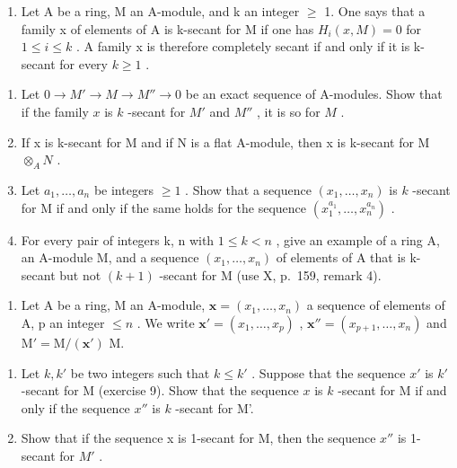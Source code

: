 \begin{enumerate}
\def\labelenumi{\arabic{enumi})}
\setcounter{enumi}{8}
\tightlist
\item
  Let A be a ring, M an A-module, and k an integer \(\geqslant\) 1. One says that a family x of elements of A is k-secant for M if one has \(H_{i}(x, M) = 0\) for \(1 \leqslant i \leqslant k\) . A family x is therefore completely secant if and only if it is k-secant for every \(k \geqslant 1\) .
\end{enumerate}

\begin{enumerate}
\def\labelenumi{\alph{enumi})}
\item
  Let \(0 \to M' \to M \to M'' \to 0\) be an exact sequence of A-modules. Show that if the family \(x\) is \(k\) -secant for \(M'\) and \(M''\) , it is so for \(M\) .
\item
  If x is k-secant for M and if N is a flat A-module, then x is k-secant for M \(\otimes_{A} N\) .
\item
  Let \(a_{1},\ldots,a_{n}\) be integers \(\geqslant 1\) . Show that a sequence \((x_{1},\ldots,x_{n})\) is \(k\) -secant for M if and only if the same holds for the sequence \((x_{1}^{a_{1}},\ldots,x_{n}^{a_{n}})\) .
\item
  For every pair of integers k, n with \(1 \leqslant k < n\) , give an example of a ring A, an A-module M, and a sequence \((x_{1}, \ldots, x_{n})\) of elements of A that is k-secant but not \((k + 1)\) -secant for M (use X, p.~159, remark 4).
\end{enumerate}

\begin{enumerate}
\def\labelenumi{\arabic{enumi})}
\setcounter{enumi}{9}
\tightlist
\item
  Let A be a ring, M an A-module, \(\boldsymbol{x} = (x_{1}, \ldots, x_{n})\) a sequence of elements of A, p an integer \(\leqslant n\) . We write \(\boldsymbol{x}' = (x_{1}, \ldots, x_{p})\) , \(\boldsymbol{x}'' = (x_{p+1}, \ldots, x_{n})\) and \(\mathrm{M}' = \mathrm{M}/(\boldsymbol{x}')\) M.
\end{enumerate}

\begin{enumerate}
\def\labelenumi{\alph{enumi})}
\item
  Let \(k, k'\) be two integers such that \(k \leqslant k'\) . Suppose that the sequence \(x'\) is \(k'\) -secant for M (exercise 9). Show that the sequence \(x\) is \(k\) -secant for M if and only if the sequence \(x''\) is \(k\) -secant for M'.
\item
  Show that if the sequence x is 1-secant for M, then the sequence \(x''\) is 1-secant for \(M'\) .
\end{enumerate}

